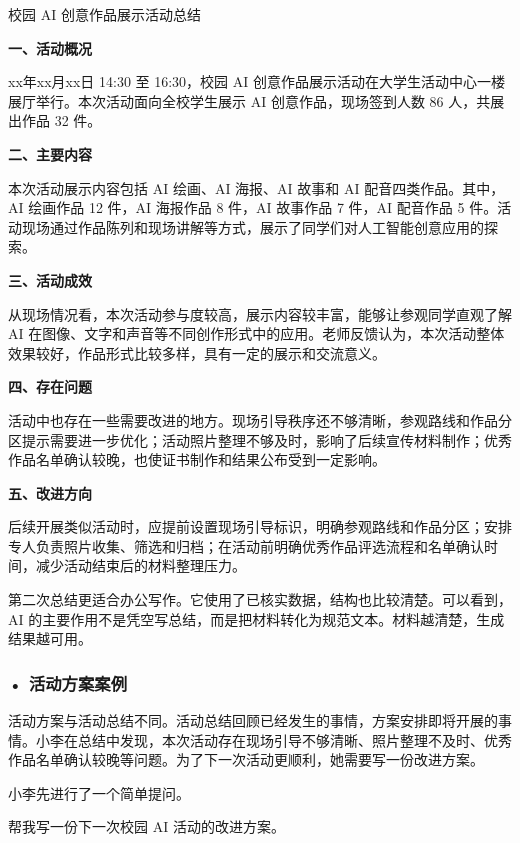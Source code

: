 \begin{aibox}
校园 AI 创意作品展示活动总结

\textbf{一、活动概况}

xx年xx月xx日 14:30 至 16:30，校园 AI 创意作品展示活动在大学生活动中心一楼展厅举行。本次活动面向全校学生展示 AI 创意作品，现场签到人数 86 人，共展出作品 32 件。

\textbf{二、主要内容}

本次活动展示内容包括 AI 绘画、AI 海报、AI 故事和 AI 配音四类作品。其中，AI 绘画作品 12 件，AI 海报作品 8 件，AI 故事作品 7 件，AI 配音作品 5 件。活动现场通过作品陈列和现场讲解等方式，展示了同学们对人工智能创意应用的探索。

\textbf{三、活动成效}

从现场情况看，本次活动参与度较高，展示内容较丰富，能够让参观同学直观了解 AI 在图像、文字和声音等不同创作形式中的应用。老师反馈认为，本次活动整体效果较好，作品形式比较多样，具有一定的展示和交流意义。

\textbf{四、存在问题}

活动中也存在一些需要改进的地方。现场引导秩序还不够清晰，参观路线和作品分区提示需要进一步优化；活动照片整理不够及时，影响了后续宣传材料制作；优秀作品名单确认较晚，也使证书制作和结果公布受到一定影响。

\textbf{五、改进方向}

后续开展类似活动时，应提前设置现场引导标识，明确参观路线和作品分区；安排专人负责照片收集、筛选和归档；在活动前明确优秀作品评选流程和名单确认时间，减少活动结束后的材料整理压力。
\end{aibox}

第二次总结更适合办公写作。它使用了已核实数据，结构也比较清楚。可以看到，AI 的主要作用不是凭空写总结，而是把材料转化为规范文本。材料越清楚，生成结果越可用。

\subsubsection*{\textbf{• 活动方案案例}}

活动方案与活动总结不同。活动总结回顾已经发生的事情，方案安排即将开展的事情。小李在总结中发现，本次活动存在现场引导不够清晰、照片整理不及时、优秀作品名单确认较晚等问题。为了下一次活动更顺利，她需要写一份改进方案。


小李先进行了一个简单提问。

\begin{userbox}
帮我写一份下一次校园 AI 活动的改进方案。
\end{userbox}

